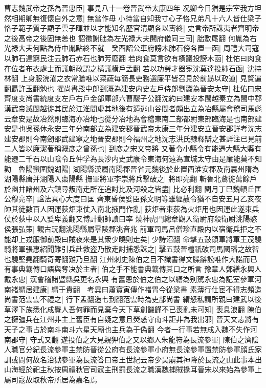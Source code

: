 曹志魏武帝之孫為晉忠臣|{
	事見八十一卷晉武帝太康四年}
况卿今日猶是宗室我方坦然相期卿無復懷自外之意|{
	無當作毋}
小待當自知我寸心子恪兄弟凡十六人皆仕梁子恪子範子質子顯子雲子暉並以才能知名歷官清顯各以夀終|{
	史言帝所誅夷者齊明帝之後高帝之後固無恙也}
詔徵謝朏為左光禄大夫開府儀同三司|{
	朏敷尾翻}
何胤為右光禄大夫何點為侍中胤點終不就　癸酉詔公車府謗木肺石傍各置一函|{
	周禮大司寇以肺石達窮民注云肺石赤石也肺芳廢翻}
若肉食莫言欲有橫議投謗木函|{
	杜佑曰肉食在位者布衣處士而議朝政謂之橫議横戶孟翻}
若以功勞才器寃沈莫達投肺石函|{
	沈持林翻}
上身服浣濯之衣常膳唯以菜蔬每簡長吏務選廉平皆召見於前勗以政道|{
	見賢遍翻勗許玉翻勉也}
擢尚書殿中郎到溉為建安内史左戶侍郎劉鬷為晉安太守|{
	杜佑曰宋齊度支尚書統度支左戶右戶金部庫部六曹鬷子公翻沈約曰建安本閩越秦立為閩中郡漢武帝滅閩越徙其民於江淮間虛其地後有遁逃山谷間者頗出立為冶縣屬會稽司馬彪云章安是故冶然則臨海亦冶地也從分冶地為會稽東南二部都尉東部臨海是也南部建安是也吳孫休永安三年分南部立為建安郡晉武帝太康三年分建安立晉安郡詳考沈志建安郡則今南劒邵武建寧之地晉安郡則今福州之地沈志洪氏隸釋辯之甚詳注已見前}
二人皆以廉潔著稱溉彦之曾孫也|{
	到彦之宋文帝將}
又著令小縣令有能遷大縣大縣有能遷二千石以山陰令丘仲孚為長沙内史武康令東海何遠為宣城太守由是廉能莫不知勸　魯陽蠻圍魏湖陽|{
	湖陽縣漢屬南陽郡晉省元魏後於此置西淮安郡及南襄州隋為湖陽縣唐并湖陽入棗陽縣}
撫軍將軍李崇將兵擊破之|{
	將即亮翻}
斬魯北鷰徙萬餘戶於幽并諸州及六鎮尋叛南走所在追討比及河殺之皆盡|{
	比必利翻}
閏月丁巳魏頓丘匡公穆亮卒|{
	諡法真心大度曰匡}
齊東昏侯嬖臣孫文明等雖經赦令猶不自安五月乙亥夜帥其徒數百人因運荻炬束仗入南北掖門作亂|{
	荻炬者束荻為火炬用也因運此遂束兵仗於荻中以入嬖卑義翻又博計翻帥讀曰率}
燒神虎門總章觀入衛尉府殺衛尉洮陽愍侯張弘策|{
	觀古玩翻洮陽縣屬零陵郡洮音兆}
前軍司馬呂僧珍直殿内以宿衛兵拒之不能却上戎服御前殿曰賊夜來是其衆少曉則走矣|{
	少詩沼翻}
命擊五鼓領軍將軍王茂驍騎將軍張惠紹聞難引兵赴救盗乃散走討捕悉誅之|{
	擊五鼓晉檀祇破司馬國璠之故智也驍堅堯翻騎奇寄翻難乃旦翻}
江州刺史陳伯之目不識書得文牒辭訟唯作大諾而已有事典籖傳口語與奪决於主者|{
	伯之手不能書典籖傳其口之所言}
豫章人鄧繕永興人戴永忠|{
	漢會稽諸暨縣吳更名永興}
有舊恩於伯之伯之以繕為别駕永忠為記室參軍河南禇緭居建康|{
	緭于貴翻　考異曰蕭寶寅傳作褚胃今從梁書}
素薄行仕宦不得志頻造尚書范雲雲不禮之|{
	行下孟翻造七到翻范雲時為吏部尚書}
緭怒私謂所親曰建武以後草澤下族悉化成䝿人吾何罪而見棄今天下草創饑饉不已喪亂未可知|{
	喪息浪翻}
陳伯之擁彊兵在江州非主上舊臣有自疑之意且熒惑守南斗詎非為我出邪|{
	晉天文志將有天子之事占於南斗南斗六星天廟也主兵為于偽翻}
今者一行事若無成入魏不失作河南郡守|{
	守式又翻}
遂投伯之大見親狎伯之又以鄉人朱龍符為長流參軍|{
	陳伯之濟陰人職官分紀長流參軍主禁防晉從公府有長流參軍小府無長流參軍置禁防參軍顔氏家訓或問何故名治獄參軍為長流答曰帝王世紀云帝少昊崩其神降於長流之山此事本出山海經於祀主秋按周禮秋官司寇主刑罰長流之職漢魏捕賊掾耳晉宋以來始為參軍上屬司寇故取秋帝所居為嘉名焉}
